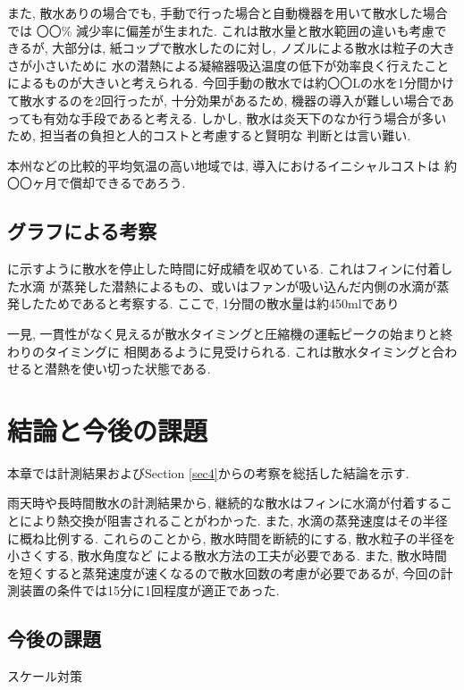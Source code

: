 \documentclass[a4j,fleqn,dvipdfmx,uplatex]{jsarticle}
\newcommand{\secref}[1]{Section \ref{#1}\hspace{0.2zw}}
\begin{document}
また, 散水ありの場合でも, 手動で行った場合と自動機器を用いて散水した場合では
〇〇\% 減少率に偏差が生まれた. これは散水量と散水範囲の違いも考慮できるが, 
大部分は, 紙コップで散水したのに対し, ノズルによる散水は粒子の大きさが小さいために
水の潜熱による凝縮器吸込温度の低下が効率良く行えたことによるものが大きいと考えられる. 
今回手動の散水では約〇〇Lの水を1分間かけて散水するのを2回行ったが, 十分効果があるため, 
機器の導入が難しい場合であっても有効な手段であると考える. 
しかし, 散水は炎天下のなか行う場合が多いため, 担当者の負担と人的コストと考慮すると賢明な
判断とは言い難い. 

本州などの比較的平均気温の高い地域では, 導入におけるイニシャルコストは
約〇〇ヶ月で償却できるであろう. 



\subsection{グラフによる考察}
に示すように散水を停止した時間に好成績を収めている. これはフィンに付着した水滴
が蒸発した潜熱によるもの、或いはファンが吸い込んだ内側の水滴が蒸発したためであると考察する. 
ここで, 1分間の散水量は約450mlであり

一見, 一貫性がなく見えるが散水タイミングと圧縮機の運転ピークの始まりと終わりのタイミングに
相関あるように見受けられる. これは散水タイミングと合わせると潜熱を使い切った状態である. 


\section{結論と今後の課題}
本章では計測結果および\secref{sec4}からの考察を総括した結論を示す. 

雨天時や長時間散水の計測結果から, 継続的な散水はフィンに水滴が付着することにより熱交換が阻害されることがわかった. 
また, 水滴の蒸発速度はその半径に概ね比例する. 
これらのことから, 散水時間を断続的にする, 散水粒子の半径を小さくする, 散水角度など
による散水方法の工夫が必要である. 
また, 散水時間を短くすると蒸発速度が速くなるので散水回数の考慮が必要であるが, 
今回の計測装置の条件では15分に1回程度が適正であった. 

\subsection{今後の課題}
\cite{thesis3} スケール対策
\end{document}

